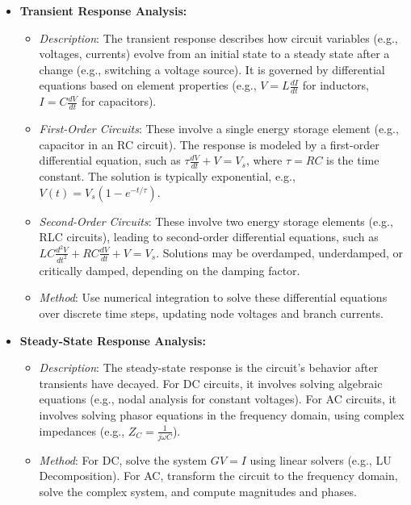 \documentclass{article}
\begin{document}
\begin{itemize}
    \item \textbf{Transient Response Analysis:}
    \begin{itemize}
        \item \textit{Description}: The transient response describes how circuit variables (e.g., voltages, currents) evolve from an initial state to a steady state after a change (e.g., switching a voltage source). It is governed by differential equations based on element properties (e.g., \( V = L \frac{dI}{dt} \) for inductors, \( I = C \frac{dV}{dt} \) for capacitors).
        \item \textit{First-Order Circuits}: These involve a single energy storage element (e.g., capacitor in an RC circuit). The response is modeled by a first-order differential equation, such as \( \tau \frac{dV}{dt} + V = V_s \), where \( \tau = RC \) is the time constant. The solution is typically exponential, e.g., \( V(t) = V_s (1 - e^{-t/\tau}) \).
        \item \textit{Second-Order Circuits}: These involve two energy storage elements (e.g., RLC circuits), leading to second-order differential equations, such as \( L C \frac{d^2V}{dt^2} + R C \frac{dV}{dt} + V = V_s \). Solutions may be overdamped, underdamped, or critically damped, depending on the damping factor.
        \item \textit{Method}: Use numerical integration to solve these differential equations over discrete time steps, updating node voltages and branch currents.
    \end{itemize}

    \item \textbf{Steady-State Response Analysis:}
    \begin{itemize}
        \item \textit{Description}: The steady-state response is the circuit’s behavior after transients have decayed. For DC circuits, it involves solving algebraic equations (e.g., nodal analysis for constant voltages). For AC circuits, it involves solving phasor equations in the frequency domain, using complex impedances (e.g., \( Z_C = \frac{1}{j \omega C} \)).
        \item \textit{Method}: For DC, solve the system \( GV = I \) using linear solvers (e.g., LU Decomposition). For AC, transform the circuit to the frequency domain, solve the complex system, and compute magnitudes and phases.
    \end{itemize}


\end{itemize}
\end{document}
